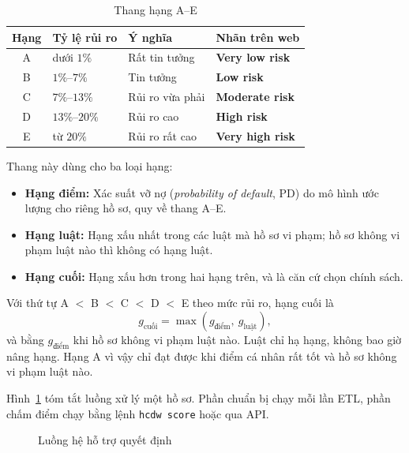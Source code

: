 \begin{table}[H]
	\centering
	\caption{Thang hạng A--E}
	\label{tab:grade-scale}
	\footnotesize
	\begin{tabular}{c l l l}
		\toprule
		\textbf{Hạng} & \textbf{Tỷ lệ rủi ro} & \textbf{Ý nghĩa} & \textbf{Nhãn trên web}  \\
		\midrule
		A             & dưới $1\%$            & Rất tin tưởng    & \textbf{Very low risk}  \\
		B             & $1\%$--$7\%$          & Tin tưởng        & \textbf{Low risk}       \\
		C             & $7\%$--$13\%$         & Rủi ro vừa phải  & \textbf{Moderate risk}  \\
		D             & $13\%$--$20\%$        & Rủi ro cao       & \textbf{High risk}      \\
		E             & từ $20\%$             & Rủi ro rất cao   & \textbf{Very high risk} \\
		\bottomrule
	\end{tabular}
\end{table}

Thang này dùng cho ba loại hạng:
\begin{itemize}[topsep=0pt, itemsep=1pt]
	\item \textbf{Hạng điểm:} Xác suất vỡ nợ (\textit{probability of default}, PD) do mô hình ước lượng cho riêng hồ sơ, quy về thang A--E.
	\item \textbf{Hạng luật:} Hạng xấu nhất trong các luật mà hồ sơ vi phạm; hồ sơ không vi phạm luật nào thì không có hạng luật.
	\item \textbf{Hạng cuối:} Hạng xấu hơn trong hai hạng trên, và là căn cứ chọn chính sách.
\end{itemize}

Với thứ tự A $<$ B $<$ C $<$ D $<$ E theo mức rủi ro, hạng cuối là
\begin{equation}
	g_{\text{cuối}} = \max\left(g_{\text{điểm}},\ g_{\text{luật}}\right),
\end{equation}
và bằng $g_{\text{điểm}}$ khi hồ sơ không vi phạm luật nào. Luật chỉ hạ hạng, không bao giờ nâng hạng. Hạng A vì vậy chỉ đạt được khi điểm cá nhân rất tốt và hồ sơ không vi phạm luật nào.

\medskip

Hình~\ref{fig:dss_flow} tóm tắt luồng xử lý một hồ sơ. Phần chuẩn bị chạy mỗi lần ETL, phần chấm điểm chạy bằng lệnh \texttt{hcdw score} hoặc qua API.

\begin{figure}[H]
	\centering
	\caption{Luồng hệ hỗ trợ quyết định}
	\label{fig:dss_flow}
\end{figure}

